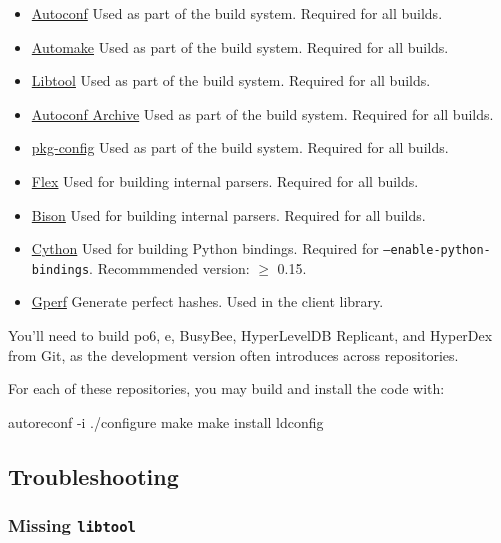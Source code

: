\begin{itemize}
\item \href{http://www.gnu.org/software/autoconf/}{Autoconf} Used as part of
    the build system.  Required for all builds.
\item \href{http://www.gnu.org/software/automake/}{Automake} Used as part of
    the build system.  Required for all builds.
\item \href{http://www.gnu.org/software/libtool/}{Libtool} Used as part of the
    build system.  Required for all builds.
\item \href{http://www.gnu.org/software/autoconf-archive/}{Autoconf Archive}
    Used as part of the build system.  Required for all builds.
\item \href{http://www.freedesktop.org/wiki/Software/pkg-config/}{pkg-config}
    Used as part of the build system.  Required for all builds.
\item \href{http://flex.sourceforge.net/}{Flex} Used for building internal
    parsers.  Required for all builds.
\item \href{http://www.gnu.org/software/bison/}{Bison} Used for building
    internal parsers.  Required for all builds.
\item \href{http://cython.org/}{Cython} Used for building Python bindings.
    Required for \texttt{--enable-python-bindings}.
    Recommmended version: $\ge$ 0.15.
\item \href{http://www.gnu.org/software/gperf/}{Gperf}  Generate perfect
    hashes.  Used in the client library.
\end{itemize}

You'll need to build po6, e, BusyBee, HyperLevelDB Replicant, and HyperDex from
Git, as the development version often introduces across repositories.

For each of these repositories, you may build and install the code with:

\begin{consolecode}
autoreconf -i
./configure
make
make install
ldconfig
\end{consolecode}

\subsection{Troubleshooting}

\subsubsection{Missing \texttt{libtool}}

